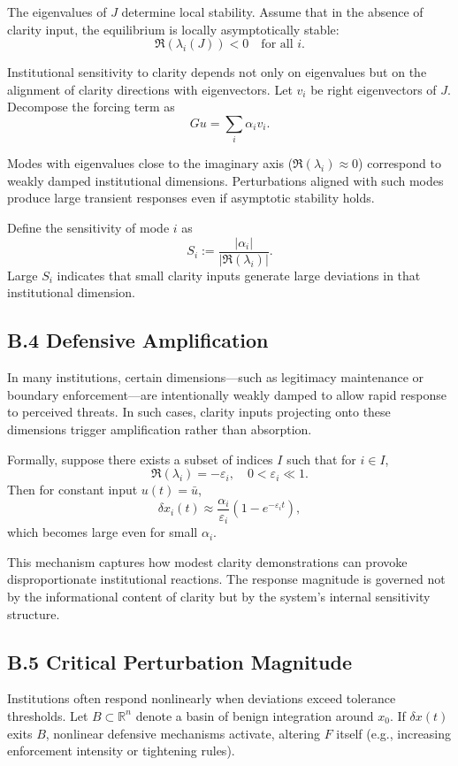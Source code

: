 \documentclass[11pt]{article}
\begin{document}
The eigenvalues of \(J\) determine local stability. Assume that in the absence of clarity input, the equilibrium is locally asymptotically stable:
\[
\Re(\lambda_i(J)) < 0 \quad \text{for all } i.
\]

Institutional sensitivity to clarity depends not only on eigenvalues but on the alignment of clarity directions with eigenvectors. Let \(v_i\) be right eigenvectors of \(J\). Decompose the forcing term as
\[
G u = \sum_i \alpha_i v_i.
\]

Modes with eigenvalues close to the imaginary axis (\(\Re(\lambda_i)\approx 0\)) correspond to weakly damped institutional dimensions. Perturbations aligned with such modes produce large transient responses even if asymptotic stability holds.

Define the sensitivity of mode \(i\) as
\[
S_i := \frac{|\alpha_i|}{|\Re(\lambda_i)|}.
\]
Large \(S_i\) indicates that small clarity inputs generate large deviations in that institutional dimension.

\subsection{B.4 Defensive Amplification}

In many institutions, certain dimensions—such as legitimacy maintenance or boundary enforcement—are intentionally weakly damped to allow rapid response to perceived threats. In such cases, clarity inputs projecting onto these dimensions trigger amplification rather than absorption.

Formally, suppose there exists a subset of indices \(I\) such that for \(i\in I\),
\[
\Re(\lambda_i) = -\varepsilon_i,
\quad
0 < \varepsilon_i \ll 1.
\]
Then for constant input \(u(t)=\bar{u}\),
\[
\delta x_i(t) \approx \frac{\alpha_i}{\varepsilon_i}(1-e^{-\varepsilon_i t}),
\]
which becomes large even for small \(\alpha_i\).

This mechanism captures how modest clarity demonstrations can provoke disproportionate institutional reactions. The response magnitude is governed not by the informational content of clarity but by the system’s internal sensitivity structure.

\subsection{B.5 Critical Perturbation Magnitude}

Institutions often respond nonlinearly when deviations exceed tolerance thresholds. Let \(B\subset\mathbb{R}^n\) denote a basin of benign integration around \(x_0\). If \(\delta x(t)\) exits \(B\), nonlinear defensive mechanisms activate, altering \(F\) itself (e.g., increasing enforcement intensity or tightening rules).
\end{document}
